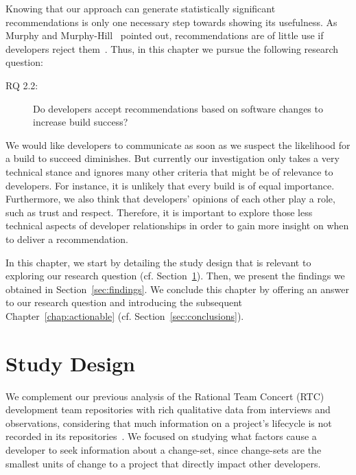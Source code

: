 \label{chap:talk}
Knowing that our approach can generate statistically significant recommendations is only one necessary step towards showing its usefulness.
As Murphy and Murphy-Hill~\cite{murphy:rsse:2010} pointed out, recommendations are of little use if developers reject them~\cite{schroeter:cscw:2012}.
Thus, in this chapter we pursue the following research question:

\begin{description}
  \item[RQ 2.2:] Do developers accept recommendations based on software changes to increase build success? 
\end{description}

We would like developers to communicate as soon as we suspect the likelihood for a build to succeed diminishes.
But currently our investigation only takes a very technical stance and ignores many other criteria that might be of relevance to developers.
For instance, it is unlikely that every build is of equal importance.
Furthermore, we also think that developers' opinions of each other play a role, such as trust and respect.
Therefore, it is important to explore those less technical aspects of developer relationships in order to gain more insight on when to deliver a recommendation.

In this chapter, we start by detailing the study design that is relevant to exploring our research question (cf. Section~\ref{sec:studydesign}).
Then, we present the findings we obtained in Section~\ref{sec:findings}.
We conclude this chapter by offering an answer to our research question and introducing the subsequent Chapter~\ref{chap:actionable} (cf. Section~\ref{sec:conclusions}).


\section{Study Design}
\label{sec:studydesign}
We complement our previous analysis of the Rational Team Concert (RTC) development team repositories with rich qualitative data from interviews and observations, considering that much information on a project's lifecycle is not recorded in its repositories~\cite{aranda:icse:2009}. We focused on studying what factors cause a developer to seek information about a change-set, since change-sets are the smallest units of change to a project that directly impact other developers.

